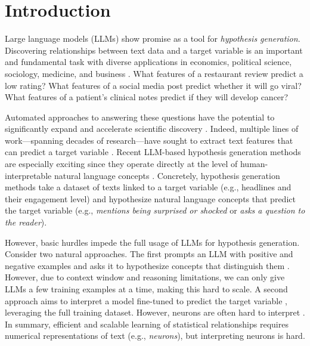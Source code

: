 \section{Introduction}
\label{sec:intro}

Large language models (LLMs) show promise as a tool for \textit{hypothesis generation}. Discovering relationships between text data and a target variable is an important and fundamental task with diverse applications in economics, political science, sociology, medicine, and business \citep{grimmer2010bayesian, rathje2021out, sun_negative_2022, gentzkow_what_2010, monroe_fightin_2009, nelson2020computational, ranard2016yelp, ting2017using}. What features of a restaurant review predict a low rating? What features of a social media post predict whether it will go viral? What features of a patient's clinical notes predict if they will develop cancer? 

Automated approaches to answering these questions have the potential to significantly expand and accelerate scientific discovery \citep{ludwig_machine_2023a}. Indeed, multiple lines of work---spanning decades of research---have sought to extract text features that can predict a target variable \citep{blei_latent_2003, monroe_fightin_2009}. Recent LLM-based hypothesis generation methods are especially exciting since they operate directly at the level of human-interpretable natural language concepts \citep{zhou_hypothesis_2024, batista_words_2024, ludan_interpretabledesign_2024, zhong_explaining_2024}. Concretely, hypothesis generation methods take a dataset of texts linked to a target variable (e.g., headlines and their engagement level) and hypothesize natural language concepts that predict the target variable (e.g., \textit{mentions being surprised or shocked} or \textit{asks a question to the reader}).

However, basic hurdles impede the full usage of LLMs for hypothesis generation. Consider two natural approaches. The first prompts an LLM with positive and negative examples and asks it to hypothesize concepts that distinguish them \citep{zhou_hypothesis_2024, batista_words_2024, ludan_interpretabledesign_2024}. However, due to context window and reasoning limitations, we can only give LLMs a few training examples at a time, making this hard to scale. A second approach aims to interpret a model fine-tuned to predict the target variable \citep{zhong_explaining_2024}, leveraging the full training dataset. However, neurons are often hard to interpret \citep{elhage_toy_2022}. In summary, efficient and scalable learning of statistical relationships requires numerical representations of text (e.g., \textit{neurons}), but interpreting neurons is hard.


